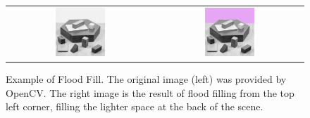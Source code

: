 \begin{figure}[H]
    \begin{center}
    \begin{tabular}{ c c }
        \includegraphics[width=0.35\textwidth]{Figures/blox.jpg} &
        \includegraphics[width=0.35\textwidth]{Figures/bloxFilled.jpg}
    \end{tabular}
    \caption[Example of Flood Fill]{Example of Flood Fill. The original image (left) was provided by OpenCV. The right image is the result of flood filling from the top left corner, filling the lighter space at the back of the scene.}
    \label{fig:EgFloodFill}
    \end{center}
\end{figure}